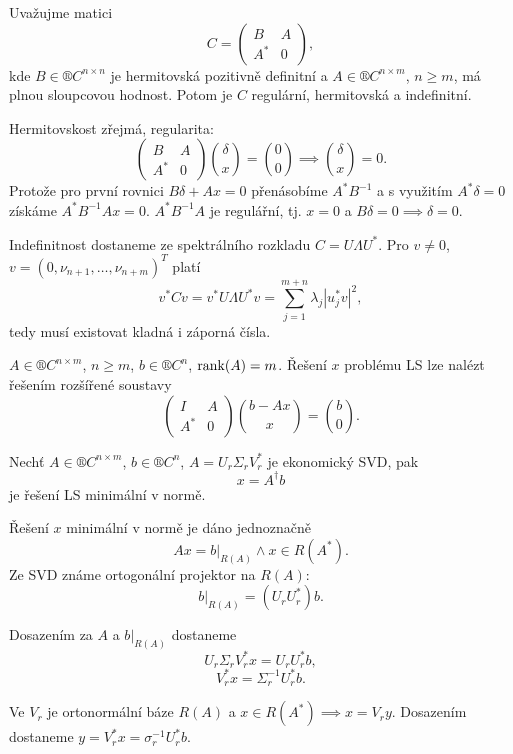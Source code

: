 \documentclass[12pt]{article}					%
\begin{document}
\begin{lemma}
	Uvažujme matici
	$$ C = \begin{pmatrix} B & A \\ A^* & 0 \end{pmatrix}, $$
	kde $B \in ®C^{n \times n}$ je hermitovská pozitivně definitní a $A \in ®C^{n \times m}$, $n ≥ m$, má plnou sloupcovou hodnost. Potom je $C$ regulární, hermitovská a indefinitní.

	\begin{dukazin}
		Hermitovskost zřejmá, regularita:
		$$ \begin{pmatrix} B & A \\ A^* & 0 \end{pmatrix} \binom{\delta}{x} = \binom{0}{0} \implies \binom{\delta}{x} = 0. $$
		Protože pro první rovnici $B\delta + Ax = 0$ přenásobíme $A^*B^{-1}$ a s využitím $A^*\delta = 0$ získáme $A^*B^{-1}Ax = 0$. $A^*B^{-1}A$ je regulářní, tj. $x = 0$ a $B \delta = 0 \implies \delta = 0$.

		Indefinitnost dostaneme ze spektrálního rozkladu $C = U\Lambda U^*$. Pro $v ≠ 0$, $v = (0, \nu_{n+1}, …, \nu_{n + m})^T$ platí
		$$ v^* C v = v^* U \Lambda U^* v = \sum_{j=1}^{m+n} \lambda_j |u_j^*v|^2, $$
		tedy musí existovat kladná i záporná čísla.
	\end{dukazin}
\end{lemma}

\begin{veta}
	$A \in ®C^{n \times m}$, $n ≥ m$, $b \in ®C^n$, $\operatorname{rank}(A) = m$. Řešení $x$ problému LS lze nalézt řešením rozšířené soustavy
	$$ \begin{pmatrix} I & A \\ A^* & 0 \end{pmatrix} \binom{b - Ax}{x} = \binom{b}{0}. $$
\end{veta}

\begin{veta}
	Nechť $A \in ®C^{n \times m}$, $b \in ®C^n$, $A = U_r \Sigma_r V_r^*$ je ekonomický SVD, pak
	$$ x = A^\dagger b $$
	je řešení LS minimální v normě.
	
	\begin{dukazin}
		Řešení $x$ minimální v normě je dáno jednoznačně
		$$ Ax = b|_{R(A)} \land x \in R(A^*). $$
		Ze SVD známe ortogonální projektor na $R(A)$:
		$$ b|_{R(A)} = (U_rU_r^*)b. $$
		
		Dosazením za $A$ a $b|_{R(A)}$ dostaneme
		$$ U_r\Sigma_rV_r^* x = U_rU_r^* b, $$
		$$ V_r^* x = \Sigma_r^{-1} U_r^* b. $$

		Ve $V_r$ je ortonormální báze $R(A)$ a $x \in R(A^*) \implies x = V_r y$. Dosazením dostaneme $y = V_r^* x = \sigma_r^{-1} U_r^* b$.
	\end{dukazin}
\end{veta}
\end{document}
